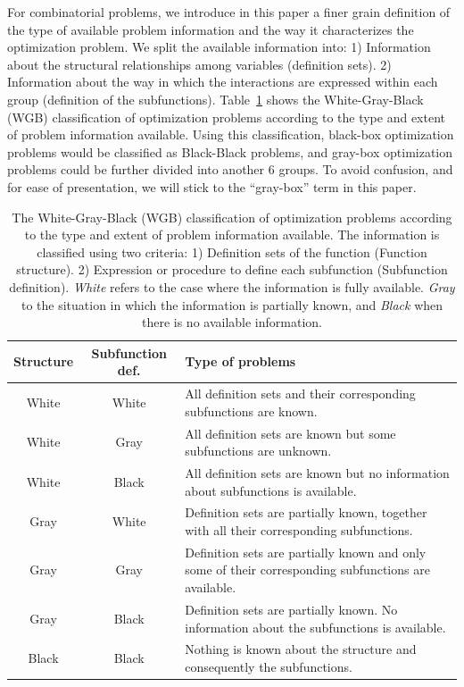 \documentclass{article} %
\begin{document}
 For combinatorial problems, we introduce in this paper a finer grain definition of the type of available problem information and the way it characterizes the  optimization problem. We split the available information into: 1) Information about the structural relationships among variables (definition sets). 2) Information about the way in which the interactions are expressed within each group (definition of the subfunctions). Table~\ref{tab:WHITE_GRAY_BLACK} shows the White-Gray-Black (WGB) classification of optimization problems according to the type and extent of problem information available. Using this classification, black-box optimization problems would be classified as Black-Black problems, and gray-box optimization problems could be further divided into another $6$ groups. To avoid confusion, and for ease of presentation, we will stick to the ``gray-box'' term in this paper.  



 \begin{table}
\begin{center}
\scriptsize
\begin{tabular}{c|c|l}
\hline\hline
   Structure  & Subfunction def.  &  Type of problems \\ \hline \hline  
   White      & White     &  All definition sets and their corresponding subfunctions are known. \\
   White      & Gray      &  All definition sets are known but some subfunctions are unknown. \\ 
   White      & Black      & All definition sets are known but no information about subfunctions is available. \\ 
   Gray       & White      & Definition sets are partially known, together with all their corresponding subfunctions. \\ 
   Gray       & Gray       & Definition sets are partially known and only some of their corresponding subfunctions are available. \\ 
   Gray       & Black      & Definition sets are partially known. No information about the subfunctions is available.  \\ 
   Black      & Black      &  Nothing is known about the structure and consequently the subfunctions.\\  \hline \hline  
\end{tabular}
\caption{The White-Gray-Black (WGB) classification of optimization problems according to the type and extent of problem information available. The information is classified using two criteria:  1) Definition sets of the function (Function structure). 2) Expression or procedure to define each subfunction (Subfunction definition). \emph{White} refers to the case where the information is fully available. \emph{Gray} to the situation in which the information is partially known, and \emph{Black} when there is no available information.}
\label{tab:WHITE_GRAY_BLACK}
\end{center}
\end{table}
\end{document}
